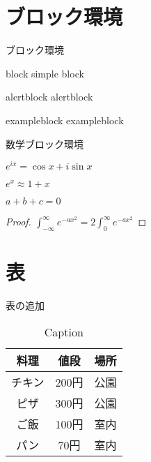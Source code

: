 \documentclass[aspectratio=169, dvipdfmx, 12pt]{beamer}
\begin{document}
\section{ブロック環境}
\begin{frame}{ブロック環境}
	\begin{block}{block}
		simple block
	\end{block}
	\begin{alertblock}{alertblock}
		alertblock
	\end{alertblock}
	\begin{exampleblock}{exampleblock}
		exampleblock
	\end{exampleblock}
\end{frame}

\begin{frame}{数学ブロック環境}
	\begin{theorem}[定理名]
		$e^{ix} = \cos x + i \sin x$
	\end{theorem}
	\begin{definition}[定義名]
		$e^{x} \approx 1 + x$
	\end{definition}
	\begin{corollary}[系名]
		$a + b + c = 0$
	\end{corollary}
	\begin{proof}
		$\int_{-\infty}^{\infty} e^{-a x^{2}} = 2 \int_{0}^{\infty} e^{-a x^{2}}$
	\end{proof}
\end{frame}

\section{表}
\begin{frame}{表の追加}
	\begin{table}
		\caption{Caption}
		\label{table:sample}
		\centering
		\begin{tabular}{ccc}
			\hline
			料理   & 値段  & 場所 \\
			\hline \hline
			チキン & 200円 & 公園 \\
			ピザ   & 300円 & 公園 \\
			ご飯   & 100円 & 室内 \\
			パン   & 70円  & 室内 \\
			\hline
		\end{tabular}
	\end{table}
\end{frame}
\end{document}
